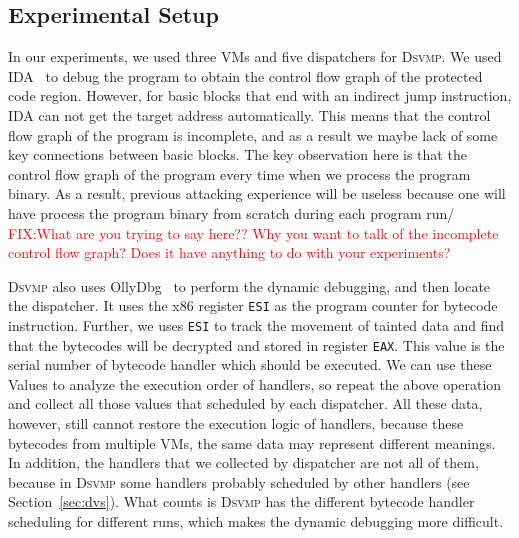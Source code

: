 \documentclass[conference]{IEEEtran}
\newcommand{\DSVMP}{\textsc{Dsvmp}\xspace}
\newcommand\FIXME[1]{\textcolor{red}{FIX:}\textcolor{red}{#1}}
\begin{document}
\subsection{Experimental Setup}
In our experiments, we used three VMs and five dispatchers for \DSVMP. We used IDA~\cite{14Idapro} to debug the program to obtain the control flow graph of the protected code region. 
However, for basic blocks that end with an indirect jump instruction, IDA can not get the target address automatically. This means that the control flow graph of the program is incomplete, 
and as a result we maybe lack of some key connections between basic blocks. The key observation here is that the control flow graph of the program every time when we process the program binary. 
As a result, previous attacking experience will be useless because one will have process the program binary from scratch during each program run/ 
\FIXME{What are you trying to say here?? Why you want to talk of the incomplete control flow graph? Does it have anything to do with your experiments?}

\DSVMP also uses OllyDbg~\cite{15Ollydbg} to perform the dynamic debugging, and then locate the dispatcher. It uses the x86 register \texttt{ESI} as the program counter for bytecode instruction. Further, we uses \texttt{ESI} to track the movement of tainted data and find that the bytecodes will be decrypted and stored in register \texttt{EAX}. This value is the serial number of bytecode handler which should be executed. We can use these Values to analyze the execution order of handlers, so repeat the above operation and collect all those values that scheduled by each dispatcher. All these data, however, still cannot restore the execution logic of handlers, because these bytecodes from multiple VMs, the same data may represent different meanings. In addition, the handlers that we collected by dispatcher are not all of them, because in \DSVMP some handlers probably scheduled by other handlers (see Section~\ref{sec:dvs}). What counts is \DSVMP has the different bytecode handler scheduling for different runs, which makes the dynamic debugging more difficult.
\end{document}

